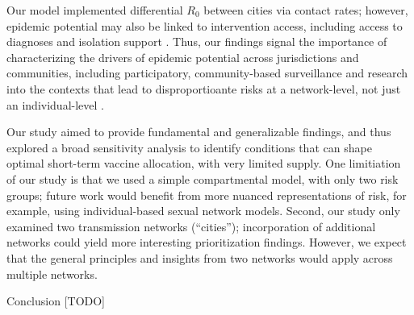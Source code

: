 Our model implemented differential $R_0$ between cities via contact rates;
however, epidemic potential may also be linked to intervention access,
including access to diagnoses and isolation support \cite{}.
Thus, our findings signal the importance of characterizing
the drivers of epidemic potential across jurisdictions and communities,
including participatory, community-based surveillance and research
into the contexts that lead to disproportioante risks at a network-level,
not just an individual-level \cite{Baral2013,Cevik2021}.
\par
Our study aimed to provide fundamental and generalizable findings, and thus
explored a broad sensitivity analysis to identify conditions that can shape
optimal short-term vaccine allocation, with very limited supply.
One limitiation of our study is that
we used a simple compartmental model, with only two risk groups;
future work would benefit from more nuanced representations of risk,
for example, using individual-based sexual network models.
Second, our study only examined two transmission networks (``cities'');
incorporation of additional networks could yield more interesting prioritization findings.
However, we expect that the general principles and insights from two networks
would apply across multiple networks.
\par
Conclusion [TODO]